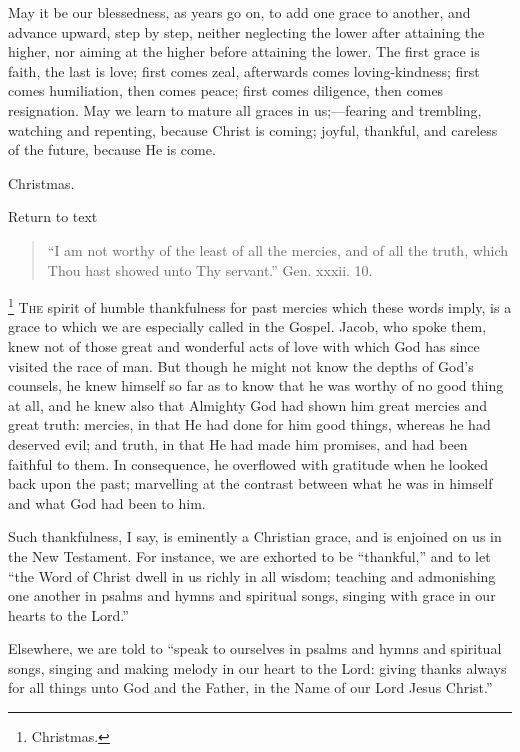 May it be our blessedness, as years go on, to add one grace to
another, and advance upward, step by step, neither neglecting the
lower after attaining the higher, nor aiming at the higher before
attaining the lower. The first grace is faith, the last is love; first
comes zeal, afterwards comes loving-kindness; first comes humiliation,
then comes peace; first comes diligence, then comes resignation. May
we learn to mature all graces in us;—fearing and trembling, watching
and repenting, because Christ is coming; joyful, thankful, and
careless of the future, because He is come.


Christmas.

Return to text


\begin{quote}

``I am not worthy of the least of all the mercies, and of all
the truth, which Thou hast showed unto Thy servant.'' Gen. xxxii.
10.

\end{quote}

\footnote{Christmas.} T\textsc{he} spirit of humble
thankfulness for past mercies which these words imply, is a grace to
which we are especially called in the Gospel. Jacob, who spoke them,
knew not of those great and wonderful acts of love with which God has
since visited the race of man. But though he might not know the depths
of God's counsels, he knew himself so far as to know that he was
worthy of no good thing at all, and he knew also that Almighty God had
shown him great mercies and great truth: mercies, in that He had done
for him good things, whereas he had deserved evil; and truth, in that
He had made him promises, and had been faithful to them. In
consequence, he overflowed with gratitude when he looked back upon the
past; marvelling at the contrast between what he was in himself and
what God had been to him.

Such thankfulness, I say, is eminently a Christian grace, and is
enjoined on us in the New Testament. For instance, we are exhorted to
be ``thankful,'' and to let ``the Word of Christ dwell in
us richly in all wisdom; teaching and admonishing one another in
psalms and hymns and spiritual songs, singing with grace in our hearts
to the Lord.''

Elsewhere, we are told to ``speak to ourselves in psalms and
hymns and spiritual songs, singing and making melody in our heart to
the Lord: giving thanks always for all things unto God and the Father,
in the Name of our Lord Jesus Christ.''


